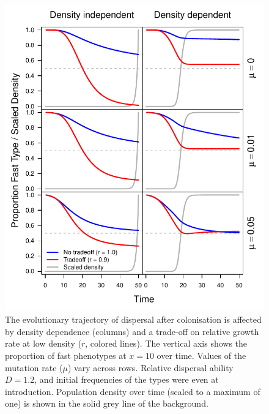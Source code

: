 \documentclass[11pt]{article}
\begin{document}
\begin{figure}[!ht]
\begin{center}
\includegraphics[width=4.68in]{../output/time_r.pdf}
\end{center}
\caption{
The evolutionary trajectory of dispersal after colonisation is affected by density dependence (columns) and a trade-off on relative growth rate at low density ($r$, colored lines). The vertical axis shows the proportion of fast phenotypes at $x=10$ over time. Values of the mutation rate ($\mu$) vary across rows. Relative dispersal ability $D=1.2$, and initial frequencies of the types were even at introduction. Population density over time (scaled to a maximum of one) is shown in the solid grey line of the background. 
}
\label{ftime_r}
\end{figure}
\end{document}
